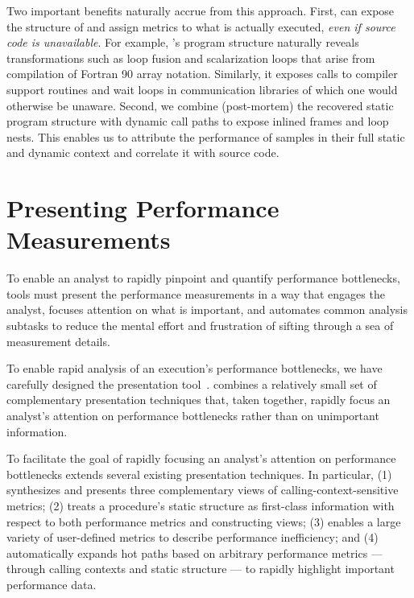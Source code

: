 \documentclass[11pt,letterpaper]{report}
\begin{document}
Two important benefits naturally accrue from this approach.
First, \HPCToolkit{} can expose the structure of and assign metrics to what is actually executed, \emph{even if source code is unavailable}.
For example, \hpcstruct{}'s program structure naturally reveals transformations such as loop fusion and scalarization loops that arise from compilation of Fortran 90 array notation.
Similarly, it exposes calls to compiler support routines and wait loops in communication libraries of which one would otherwise be unaware.
Second, we combine (post-mortem) the recovered static program structure with dynamic call paths to expose inlined frames and loop nests.
This enables us to attribute the performance of samples in their full static and dynamic context and correlate it with source code.


\section{Presenting Performance Measurements}

To enable an analyst to rapidly pinpoint and quantify performance bottlenecks, tools must present the performance measurements in a way that engages the analyst, focuses attention on what is important, and automates common analysis subtasks to reduce the mental effort and frustration of sifting through a sea of measurement details.

To enable rapid analysis of an execution's performance bottlenecks, we have carefully designed the \hpcviewer{} presentation tool~\cite{Adhianto-MC-Ta:2010:PSTI-hpcviewer}.
\hpcviewer{} combines a relatively small set of complementary presentation techniques that, taken together, rapidly focus an analyst's attention on performance bottlenecks rather than on unimportant information.

To facilitate the goal of rapidly focusing an analyst's attention on performance bottlenecks \hpcviewer{} extends several existing presentation techniques.
In particular, \hpcviewer{} (1) synthesizes and presents three complementary views of calling-context-sensitive metrics; (2) treats a procedure's static structure as first-class information with respect to both performance metrics and constructing views; (3) enables a large variety of user-defined metrics to describe performance inefficiency; and (4) automatically expands hot paths based on arbitrary performance metrics --- through calling contexts and static structure --- to rapidly highlight important performance data.
\end{document}

